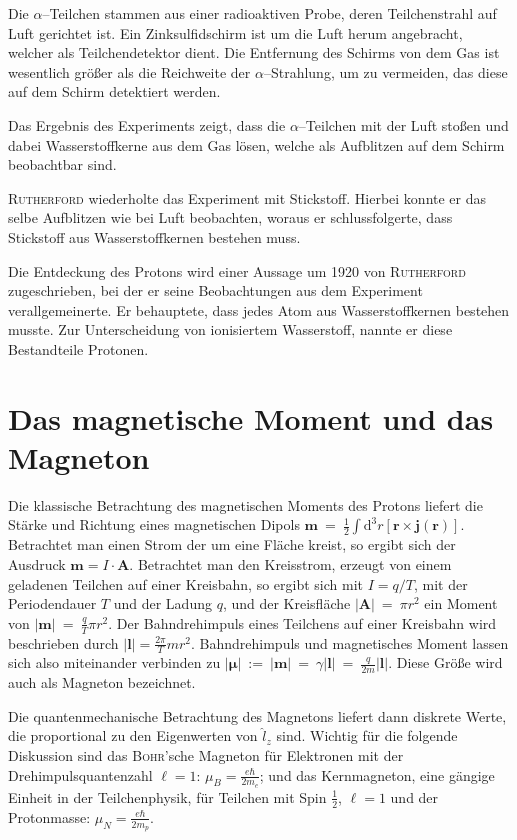 \documentclass[sn-mathphys-num,iicol]{sn-jnl}
\theoremstyle{thmstyleone}
\theoremstyle{thmstyletwo}
\theoremstyle{thmstylethree}
\newcommand{\td}{\text{d}}
\begin{document}
Die $\alpha $--Teilchen stammen aus einer radioaktiven Probe, deren Teilchenstrahl auf Luft gerichtet ist.
Ein Zinksulfidschirm ist um die Luft herum angebracht, welcher als Teilchendetektor dient.
Die Entfernung des Schirms von dem Gas ist wesentlich größer als die Reichweite der $\alpha $--Strahlung, um zu vermeiden, das diese auf dem Schirm detektiert werden.

Das Ergebnis des Experiments zeigt, dass die $\alpha $--Teilchen mit der Luft stoßen und dabei Wasserstoffkerne aus dem Gas lösen, welche als Aufblitzen auf dem Schirm beobachtbar sind.

\textsc{Rutherford} wiederholte das Experiment mit Stickstoff.
Hierbei konnte er das selbe Aufblitzen wie bei Luft beobachten, woraus er schlussfolgerte, dass Stickstoff aus Wasserstoffkernen bestehen muss.

Die Entdeckung des Protons wird einer Aussage um 1920 von \textsc{Rutherford} zugeschrieben, bei der er seine Beobachtungen aus dem Experiment verallgemeinerte.
Er behauptete, dass jedes Atom aus Wasserstoffkernen bestehen musste.
Zur Unterscheidung von ionisiertem Wasserstoff, nannte er diese Bestandteile Protonen.\cite{Rutherford_proton_discovery}\cite{Rutherford1919}

\section{Das magnetische Moment und das Magneton}
Die klassische Betrachtung des magnetischen Moments des Protons liefert die Stärke und Richtung eines magnetischen Dipols $\boldsymbol{m}~=~\tfrac{1}{2}\int\td ^3r\left[\boldsymbol{r} \times \boldsymbol{j} \left(\boldsymbol{r} \right)\right]$.
Betrachtet man einen Strom der um eine Fläche kreist, so ergibt sich der Ausdruck $\boldsymbol{m} =I\cdot \boldsymbol{A} $.
Betrachtet man den Kreisstrom, erzeugt von einem geladenen Teilchen auf einer Kreisbahn, so ergibt sich mit $I=q/T$, mit der Periodendauer $T$ und der Ladung $q$, und der Kreisfläche $|\boldsymbol{A} |~=~\pi r^2$ ein Moment von $|\boldsymbol{m} |~=~\tfrac{q}{T}\pi r^2$.
Der Bahndrehimpuls eines Teilchens auf einer Kreisbahn wird beschrieben durch $|\boldsymbol{l} |=\tfrac{2\pi }{T}mr^2$.
Bahndrehimpuls und magnetisches Moment lassen sich also miteinander verbinden zu $|\boldsymbol{\mu } |~:=~|\boldsymbol{m} |~=~\gamma |\boldsymbol{l} |~=~\tfrac{q}{2m}|\boldsymbol{l} |$.
Diese Größe wird auch als Magneton bezeichnet.

Die quantenmechanische Betrachtung des Magnetons liefert dann diskrete Werte, die proportional zu den Eigenwerten von $\hat{l}_z$ sind.
Wichtig für die folgende Diskussion sind das \textsc{Bohr}'sche Magneton für Elektronen mit der Drehimpulsquantenzahl $\ell=1$: $\mu _B=\tfrac{e\hbar }{2m_e}$; und das Kernmagneton, eine gängige Einheit in der Teilchenphysik, für Teilchen mit Spin $\tfrac{1}{2}$, $\ell=1$ und der Protonmasse: $\mu _N=\tfrac{e\hbar }{2m_p}$.
\end{document}
